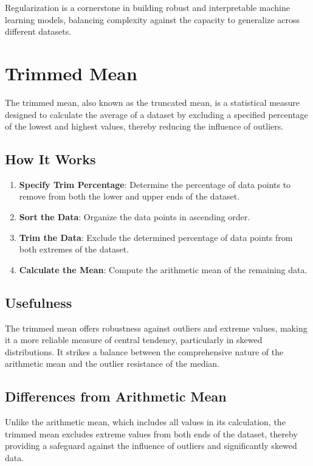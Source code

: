 \documentclass[12pt]{article}
\begin{document}
Regularization is a cornerstone in building robust and interpretable machine learning models, balancing complexity against the capacity to generalize across different datasets.

\section{Trimmed Mean}

The trimmed mean, also known as the truncated mean, is a statistical measure designed to calculate the average of a dataset by excluding a specified percentage of the lowest and highest values, thereby reducing the influence of outliers.

\subsection{How It Works}

\begin{enumerate}
    \item \textbf{Specify Trim Percentage}: Determine the percentage of data points to remove from both the lower and upper ends of the dataset.
    \item \textbf{Sort the Data}: Organize the data points in ascending order.
    \item \textbf{Trim the Data}: Exclude the determined percentage of data points from both extremes of the dataset.
    \item \textbf{Calculate the Mean}: Compute the arithmetic mean of the remaining data.
\end{enumerate}

\subsection{Usefulness}

The trimmed mean offers robustness against outliers and extreme values, making it a more reliable measure of central tendency, particularly in skewed distributions. It strikes a balance between the comprehensive nature of the arithmetic mean and the outlier resistance of the median.

\subsection{Differences from Arithmetic Mean}

Unlike the arithmetic mean, which includes all values in its calculation, the trimmed mean excludes extreme values from both ends of the dataset, thereby providing a safeguard against the influence of outliers and significantly skewed data.
\end{document}
